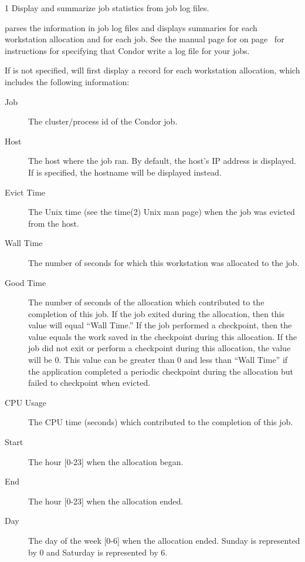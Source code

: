 \begin{ManPage}{\label{man-condor-userlog}}{1}
{Display and summarize job statistics from job log files.}
\Synopsis {}

\Description
{} parses the information in job log files and displays
summaries for each workstation allocation and for each job.  See the
manual page for  on page~\pageref{man-condor-submit} for
instructions for specifying that Condor write a log file for your
jobs.

If  is not specified,  will first display
a record for each workstation allocation, which includes the following
information:

\begin{description}
\item[Job] The cluster/process id of the Condor job.
\item[Host] The host where the job ran.  By default, the host's IP
address is displayed.  If  is specified, the hostname
will be displayed instead.
\item[Evict Time] The Unix time (see the time(2) Unix man page) when
the job was evicted from the host.
\item[Wall Time] The number of seconds for which this workstation was
allocated to the job.
\item[Good Time] The number of seconds of the allocation which
contributed to the completion of this job.  If the job exited during
the allocation, then this value will equal ``Wall Time.''  If the job
performed a checkpoint, then the value equals the work saved in
the checkpoint during this allocation.  If the job did not exit or
perform a checkpoint during this allocation, the value will be 0.
This value can be greater than 0 and less than ``Wall Time'' if the
application completed a periodic checkpoint during the allocation but
failed to checkpoint when evicted.
\item[CPU Usage] The CPU time (seconds) which contributed to the completion of
this job.
\item[Start] The hour [0-23] when the allocation began.
\item[End] The hour [0-23] when the allocation ended.
\item[Day] The day of the week [0-6] when the allocation ended.
Sunday is represented by 0 and Saturday is represented by 6.
\end{description}


\end{ManPage}
